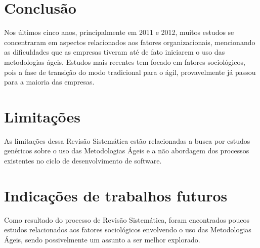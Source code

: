 \section{Conclusão}

Nos últimos cinco anos, principalmente em 2011 e 2012, muitos estudos se concentraram em aspectos relacionados aos fatores organizacionais, mencionando as dificuldades que as empresas tiveram até de fato iniciarem o uso das metodologias ágeis. Estudos mais recentes tem focado em fatores sociológicos, pois a fase de transição do modo tradicional para o ágil, provavelmente já passou para a maioria das empresas.

\section{Limitações}

As limitações dessa Revisão Sistemática estão relacionadas a busca por estudos genéricos sobre o uso das Metodologias Ágeis e a não abordagem dos processos existentes no ciclo de desenvolvimento de software.

\section{Indicações de trabalhos futuros}
Como resultado do processo de Revisão Sistemática, foram encontrados poucos estudos relacionados aos fatores sociológicos envolvendo o uso das Metodologias Ágeis, sendo possivelmente um assunto a ser melhor explorado.



